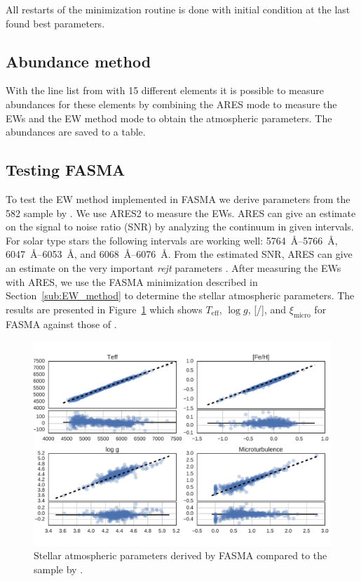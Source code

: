 \documentclass{aa}
\begin{document}
All restarts of the minimization routine is done with initial condition at the
last found best parameters.


\subsection{Abundance method}
\label{sub:Abundance_method}

With the line list from \citet{Neves2009} with 15 different elements it is
possible to measure abundances for these elements by combining the ARES mode to
measure the EWs and the EW method mode to obtain the atmospheric parameters. The
abundances are saved to a table.


\subsection{Testing FASMA}
\label{sub:Testing_FASMA}
To test the EW method implemented in FASMA we derive parameters from the 582
sample by \citet{Sousa2011}. We use ARES2 to measure the EWs. ARES can give an
estimate on the signal to noise ratio (SNR) by analyzing the continuum in given
intervals. For solar type stars the following intervals are working well:
\SIrange{5764}{5766}{\angstrom}, \SIrange{6047}{6053}{\angstrom}, and
\SIrange{6068}{6076}{\angstrom}. From the estimated SNR, ARES can give an
estimate on the very important \emph{rejt} parameters \citep[see][for more
information]{Sousa2015a}. After measuring the EWs with ARES, we use the FASMA
minimization described in Section~\ref{sub:EW_method} to determine the stellar
atmospheric parameters. The results are presented in Figure~\ref{fig:FASMATest}
which shows $T_\mathrm{eff}$, $\log g$, [/], and
$\xi_\mathrm{micro}$ for FASMA against those of \citet{Sousa2011}.

\begin{figure}[tpb]
    \centering
    \includegraphics[width=1.0\linewidth]{figures/FASMATest.pdf}
    \caption{Stellar atmospheric parameters derived by FASMA compared
    to the sample by \citet{Sousa2011}.}
    \label{fig:FASMATest}
\end{figure}
\end{document}

